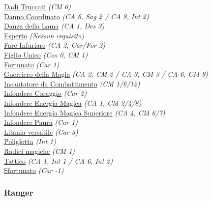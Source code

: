 \begin{multicols}{3}
{\begin{flushleft}
\hyperlink{Dadi Truccati}{Dadi Truccati} \textit{(CM 6)}\\
\hyperlink{Danno Coordinato}{Danno Coordinato} \textit{(CA 6, Sag 2 / CA 8, Int 2)}\\
\hyperlink{Danza della Lama}{Danza della Lama} \textit{(CA 1, Des 3)}\\
\hyperlink{Esperto}{Esperto} \textit{(Nessun requisito)}\\
\hyperlink{Fare Infuriare}{Fare Infuriare} \textit{(CA 2, Car/For 2)}\\
\hyperlink{Figlio Unico}{Figlio Unico} \textit{(Cos 0, CM 1)}\\
\hyperlink{Fortunato}{Fortunato} \textit{(Car 1)}\\
\hyperlink{Guerriero della Magia}{Guerriero della Magia} \textit{(CA 2, CM 2 / CA 3, CM 3 / CA 6, CM 9)}\\
\hyperlink{Incantatore da Combattimento}{Incantatore da Combattimento} \textit{(CM 1/6/12)}\\
\hyperlink{Infondere Coraggio}{Infondere Coraggio} \textit{(Car 2)}\\
\hyperlink{Infondere Energia Magica}{Infondere Energia Magica} \textit{(CA 1, CM 2/4/8)}\\
\hyperlink{Infondere Energia Magica Superiore}{Infondere Energia Magica Superiore} \textit{(CA 4, CM 6/7)}\\
\hyperlink{Infondere Paura}{Infondere Paura} \textit{(Car 1)}\\
\hyperlink{Litania versatile}{Litania versatile} \textit{(Car 3)}\\
\hyperlink{Poliglotta}{Poliglotta} \textit{(Int 1)}\\
\hyperlink{Radici magiche}{Radici magiche} \textit{(CM 1)}\\
\hyperlink{Tattico}{Tattico} \textit{(CA 1, Int 1 / CA 6, Int 2)}\\
\hyperlink{Sfortunato}{Sfortunato} \textit{(Car -1)}\\

\titlespacing*{\subsubsection}{0pt}{0.5em}{0.5em}\subsubsection*{Ranger}


\end{flushleft}}
\end{multicols}
